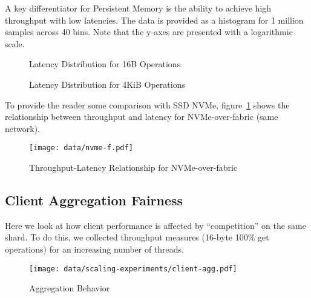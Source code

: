 \documentclass[letterpaper,twocolumn,10pt]{article}
\begin{document}
A key differentiator for Persistent Memory is the ability to
achieve high throughput with low latencies.  The data is provided
as a histogram for 1 million samples across 40 bins.  Note that
the y-axes are presented with a logarithmic scale.

\begin{figure}[ht!]
  \centering



\caption{Latency Distribution for 16B Operations}
\end{figure}

\begin{figure}[ht!]
  \centering


\caption{Latency Distribution for 4KiB Operations}
\end{figure}

To provide the reader some comparison with SSD NVMe,
figure~\ref{fig:nvmef} shows the relationship between throughput and
latency for NVMe-over-fabric (same network).

\begin{figure}[ht!]

\centering
\texttt{[image: data/nvme-f.pdf]}
\caption{Throughput-Latency Relationship for NVMe-over-fabric}
\label{fig:nvmef}
\end{figure}


\newpage 
\subsection{Client Aggregation Fairness}

Here we look at how client performance is affected by ``competition''
on the same shard.  To do this, we collected throughput measures
(16-byte 100\% get operations) for an increasing number of threads.

\begin{figure}[ht!]
\centering
\texttt{[image: data/scaling-experiments/client-agg.pdf]}
\caption{Aggregation Behavior}
\label{plot:agg0}
\end{figure}
\end{document}
